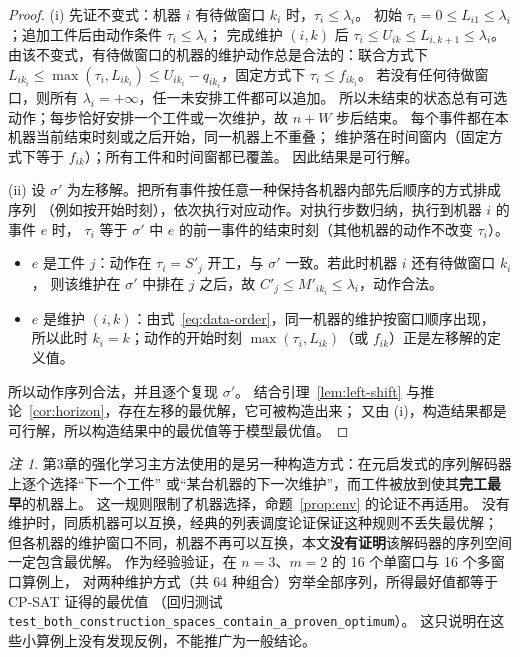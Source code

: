 \documentclass[11pt,oneside,notitlepage]{ctexrep}
\theoremstyle{definition}
\theoremstyle{remark}
\newtheorem{remark}[definition]{注}
\begin{document}
\begin{proof}
(i) 先证不变式：机器 $i$ 有待做窗口 $k_i$ 时，$\tau_i\le\lambda_i$。
初始 $\tau_i=0\le L_{i1}\le\lambda_i$；追加工件后由动作条件 $\tau_i\le\lambda_i$；
完成维护 $(i,k)$ 后 $\tau_i\le U_{ik}\le L_{i,k+1}\le\lambda_i$。
由该不变式，有待做窗口的机器的维护动作总是合法的：联合方式下
$L_{ik_i}\le\max(\tau_i,L_{ik_i})\le U_{ik_i}-q_{ik_i}$，固定方式下 $\tau_i\le f_{ik_i}$。
若没有任何待做窗口，则所有 $\lambda_i=+\infty$，任一未安排工件都可以追加。
所以未结束的状态总有可选动作；每步恰好安排一个工件或一次维护，故 $n+W$ 步后结束。
每个事件都在本机器当前结束时刻或之后开始，同一机器上不重叠；
维护落在时间窗内（固定方式下等于 $f_{ik}$）；所有工件和时间窗都已覆盖。
因此结果是可行解。

(ii) 设 $\sigma'$ 为左移解。把所有事件按任意一种保持各机器内部先后顺序的方式排成序列
（例如按开始时刻），依次执行对应动作。对执行步数归纳，执行到机器 $i$ 的事件 $e$ 时，
$\tau_i$ 等于 $\sigma'$ 中 $e$ 的前一事件的结束时刻（其他机器的动作不改变 $\tau_i$）。
\begin{itemize}[nosep]
  \item $e$ 是工件 $j$：动作在 $\tau_i=S'_j$ 开工，与 $\sigma'$ 一致。若此时机器 $i$ 还有待做窗口 $k_i$，
        则该维护在 $\sigma'$ 中排在 $j$ 之后，故 $C'_j\le M'_{ik_i}\le\lambda_i$，动作合法。
  \item $e$ 是维护 $(i,k)$：由式~\eqref{eq:data-order}，同一机器的维护按窗口顺序出现，
        所以此时 $k_i=k$；动作的开始时刻 $\max(\tau_i,L_{ik})$（或 $f_{ik}$）正是左移解的定义值。
\end{itemize}
所以动作序列合法，并且逐个复现 $\sigma'$。
结合引理~\ref{lem:left-shift} 与推论~\ref{cor:horizon}，存在左移的最优解，它可被构造出来；
又由 (i)，构造结果都是可行解，所以构造结果中的最优值等于模型最优值。
\end{proof}

\begin{remark}\label{rem:decoder}
第3章的强化学习主方法使用的是另一种构造方式：在元启发式的序列解码器上逐个选择“下一个工件”
或“某台机器的下一次维护”，而工件被放到使其\textbf{完工最早}的机器上。
这一规则限制了机器选择，命题~\ref{prop:env} 的论证不再适用。
没有维护时，同质机器可以互换，经典的列表调度论证保证这种规则不丢失最优解；
但各机器的维护窗口不同，机器不再可以互换，本文\textbf{没有证明}该解码器的序列空间一定包含最优解。
作为经验验证，在 $n=3$、$m=2$ 的 16 个单窗口与 16 个多窗口算例上，
对两种维护方式（共 64 种组合）穷举全部序列，所得最好值都等于 CP-SAT 证得的最优值
（回归测试 \texttt{test\_both\_construction\_spaces\_contain\_a\_proven\_optimum}）。
这只说明在这些小算例上没有发现反例，不能推广为一般结论。
\end{remark}
\end{document}
